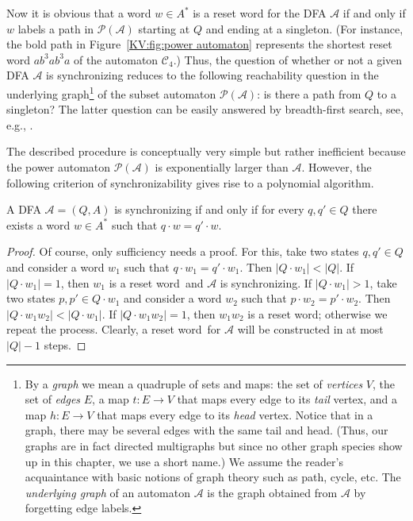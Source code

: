 \documentclass{irmaart}
\newcommand{\sw}{reset word}
\theoremstyle{plain}
\begin{document}
Now it is obvious that a word $w\in A^*$ is a reset word for the DFA
$\mathcal{A}$ if and only if $w$ labels a path in $\mathcal{P}(\mathcal{A})$
starting at $Q$ and ending at a singleton. (For instance, the bold path in
Figure~\ref{KV:fig:power automaton} represents the shortest reset word
$ab^3ab^3a$ of the automaton $\mathcal{C}_4$.) Thus, the question of whether or
not a given DFA $\mathcal{A}$ is synchronizing reduces to the following
reachability question in the underlying graph\footnote{By a
\emph{graph} we mean a quadruple of sets and maps: the set of
\emph{vertices} $V$, the set of \emph{edges} $E$, a map $t: E\to V$ that maps
every edge to its \emph{tail} vertex, and a map $h:E\to V$ that maps every edge
to its \emph{head} vertex. Notice that in a graph, there may be several edges
with the same tail and head. (Thus, our graphs are in fact directed multigraphs
but since no other graph species show up in this chapter, we use a short name.)
We assume the reader's acquaintance with basic notions of graph theory such as
path, cycle, etc. The \emph{underlying graph} of an automaton $\mathcal{A}$ is
the graph obtained from $\mathcal{A}$ by forgetting edge
labels.} of the subset automaton
$\mathcal{P}(\mathcal{A})$: is there a path from $Q$ to a singleton? The latter
question can be easily answered by breadth-first search, see, e.g.,
\cite[Section~22.2]{Cormen&Leiserson&Rivest&Stein:2001}.

The described procedure is conceptually very simple but rather inefficient
because the power automaton $\mathcal{P}(\mathcal{A})$ is exponentially larger
than $\mathcal{A}$. However, the following criterion of synchronizability gives
rise to a polynomial algorithm.
\begin{proposition}
\label{KV:prop:quadratic} A DFA $\mathcal{A}=(Q,A)$ is synchronizing if and
only if for every $q,q'\in Q$ there exists a word $w\in A^*$ such that $q\cdot
w=q'\cdot w$.
\end{proposition}

\begin{proof}
Of course, only sufficiency needs a proof. For this, take two
states $q,q'\in Q$ and consider a word $w_1$ such that $q\cdot
w_1=q'\cdot w_1$. Then $|Q\cdot w_1|<|Q|$. If $|Q\cdot w_1|=1$,
then $w_1$ is a \sw\ and $\mathcal{A}$ is synchronizing. If
$|Q\cdot w_1|>1$, take two states $p,p'\in Q\cdot w_1$ and
consider a word $w_2$ such that $p\cdot w_2=p'\cdot w_2$. Then
$|Q\cdot w_1w_2|<|Q\cdot w_1|$. If $|Q\cdot w_1w_2|=1$, then
$w_1w_2$ is a \sw; otherwise we repeat the process. Clearly, a
\sw\ for $\mathcal{A}$ will be constructed in at most $|Q|-1$
steps.
\end{proof}
\end{document}
